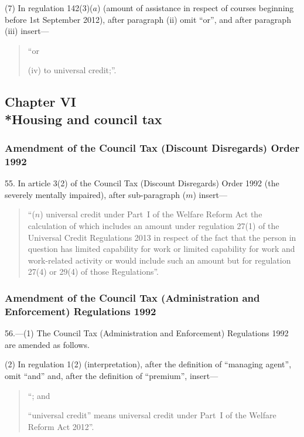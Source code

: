 \documentclass[12pt,a4paper]{article}
\begin{document}
(7) In regulation 142(3)($a$)  (amount of assistance in respect of courses beginning before 1st September 2012), after paragraph (ii)  omit “or”, and after paragraph (iii)  insert—
\begin{quotation}
“or

(iv) to universal credit;”.
\end{quotation}

\subsection[Chapter VI --- Housing and council tax]{Chapter VI\\*Housing and council tax}

\renewcommand\parthead{--- Part III Chapter VI}

\subsubsection[55. Amendment of the Council Tax (Discount Disregards) Order 1992]{Amendment of the Council Tax (Discount Disregards) Order 1992}

55.  In article 3(2) of the Council Tax (Discount Disregards) Order 1992 (the severely mentally impaired), after sub-paragraph ($m$)  insert—
\begin{quotation}
“($n$) universal credit under Part~I of the Welfare Reform Act the calculation of which includes an amount under regulation 27(1) of the Universal Credit Regulations 2013 in respect of the fact that the person in question has limited capability for work or limited capability for work and work-related activity or would include such an amount but for regulation 27(4) or 29(4) of those Regulations”.
\end{quotation}

\subsubsection[56. Amendment of the Council Tax (Administration and Enforcement) Regulations 1992]{Amendment of the Council Tax (Administration and Enforcement) Regulations 1992}

56.—(1) The Council Tax (Administration and Enforcement) Regulations 1992 are amended as follows.

(2) In regulation 1(2) (interpretation), after the definition of “managing agent”, omit “and” and, after the definition of “premium”, insert—
\begin{quotation}
“; and

“universal credit” means universal credit under Part~I of the Welfare Reform Act 2012”.
\end{quotation}
\end{document}
